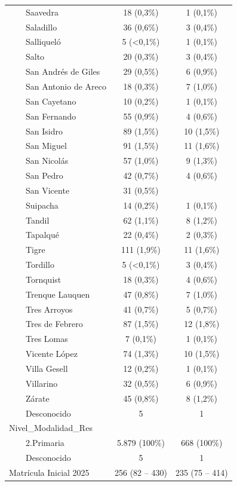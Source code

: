 \documentclass[
  spanish,
  a4paper,
]{scrreprt}
\begin{document}
\begin{table}
{\begin{tabular*}{\linewidth}{@{\extracolsep{\fill}}lcc}
    Saavedra & 18 (0,3\%) & 1 (0,1\%) \\ 
    Saladillo & 36 (0,6\%) & 3 (0,4\%) \\ 
    Salliqueló & 5 (<0,1\%) & 1 (0,1\%) \\ 
    Salto & 20 (0,3\%) & 3 (0,4\%) \\ 
    San Andrés de Giles & 29 (0,5\%) & 6 (0,9\%) \\ 
    San Antonio de Areco & 18 (0,3\%) & 7 (1,0\%) \\ 
    San Cayetano & 10 (0,2\%) & 1 (0,1\%) \\ 
    San Fernando & 55 (0,9\%) & 4 (0,6\%) \\ 
    San Isidro & 89 (1,5\%) & 10 (1,5\%) \\ 
    San Miguel & 91 (1,5\%) & 11 (1,6\%) \\ 
    San Nicolás & 57 (1,0\%) & 9 (1,3\%) \\ 
    San Pedro & 42 (0,7\%) & 4 (0,6\%) \\ 
    San Vicente & 31 (0,5\%) &  \\ 
    Suipacha & 14 (0,2\%) & 1 (0,1\%) \\ 
    Tandil & 62 (1,1\%) & 8 (1,2\%) \\ 
    Tapalqué & 22 (0,4\%) & 2 (0,3\%) \\ 
    Tigre & 111 (1,9\%) & 11 (1,6\%) \\ 
    Tordillo & 5 (<0,1\%) & 3 (0,4\%) \\ 
    Tornquist & 18 (0,3\%) & 4 (0,6\%) \\ 
    Trenque Lauquen & 47 (0,8\%) & 7 (1,0\%) \\ 
    Tres Arroyos & 41 (0,7\%) & 5 (0,7\%) \\ 
    Tres de Febrero & 87 (1,5\%) & 12 (1,8\%) \\ 
    Tres Lomas & 7 (0,1\%) & 1 (0,1\%) \\ 
    Vicente López & 74 (1,3\%) & 10 (1,5\%) \\ 
    Villa Gesell & 12 (0,2\%) & 1 (0,1\%) \\ 
    Villarino & 32 (0,5\%) & 6 (0,9\%) \\ 
    Zárate & 45 (0,8\%) & 8 (1,2\%) \\ 
    Desconocido & 5 & 1 \\ 
Nivel\_Modalidad\_Res &  &  \\ 
    2.Primaria & 5.879 (100\%) & 668 (100\%) \\ 
    Desconocido & 5 & 1 \\ 
Matrícula Inicial 2025 & 256 (82 – 430) & 235 (75 – 414) \\ 

\end{tabular*}}
\end{table}
\end{document}
